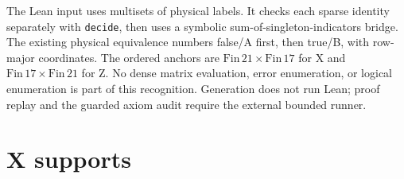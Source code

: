 \documentclass{article}
\begin{document}
The Lean input uses multisets of physical labels. It checks each sparse identity
separately with \texttt{decide}, then uses a symbolic sum-of-singleton-indicators bridge.
The existing physical equivalence numbers false/A first, then true/B, with
row-major coordinates. The ordered anchors are \(\mathrm{Fin}\,21 \times \mathrm{Fin}\,17\)
for X and \(\mathrm{Fin}\,17 \times \mathrm{Fin}\,21\) for Z. No dense matrix evaluation,
error enumeration, or logical enumeration is part of this recognition. Generation does not
run Lean; proof replay and the guarded axiom audit require the external bounded runner.

\section{X supports}\label{sec:x-supports}
\end{document}
